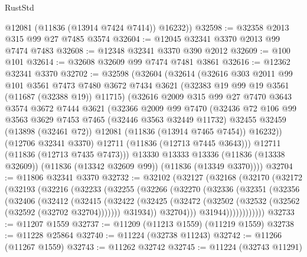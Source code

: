 \begin{lexlean}{RustStd}
\begin{coremodule}
        @12081
        (@11836 (@13914 @7424 @7414))
        @16232))
@32598 := @32358 @2013 @315 @99 @27 @7485 @3574
@32604 := @12045 @32341 @3370 @2013 @99 @7474 @7483
@32608 := @12348 @32341 @3370 @390 @2012
@32609 := @100 @101
@32614 := @32608 @32609 @99 @7474 @7481 @3861
@32616 := @12362 @32341 @3370
@32702 := @32598
    (@32604
      (@32614
        (@32616
          @303
          @2011
          @99
          @101
          @3561
          @7473
          @7480
          @3672
          @7434
          @3621
          (@32383 @19 @99 @19 @3561 (@11687 (@32388 @19)) @11715)
          (@32616
            @2009
            @315
            @99
            @27
            @7470
            @3643
            @3574
            @3672
            @7444
            @3621
            (@32366
              @2009
              @99
              @7470
              (@32436
                @72
                @106
                @99
                @3563
                @3629
                @7453
                @7465
                (@32446 @3563 @32449 @11732)
                @32455
                @32459
                (@13898 (@32461 @72))
                @12081
                (@11836 (@13914 @7465 @7454))
                @16232))
            (@12706 @32341 @3370)
            @12711
            (@11836 (@12713 @7445 @3643)))
          @12711
          (@11836 (@12713 @7435 @7473)))
        @13330
        @13333
        @13336
        (@11836 (@13338 @32609))
        (@11836 (@13342 @32609 @99))
        (@11836 (@13349 @3370))))
@32704 := @11806 @32341 @3370
@32732 := @32102
    (@32127
      (@32168
        (@32170
          (@32172
            (@32193
              (@32216
                (@32233
                  (@32255
                    (@32266
                      (@32270
                        (@32336
                          (@32351
                            (@32356
                              (@32406
                                (@32412
                                  (@32415
                                    (@32422
                                      (@32425
                                        (@32472
                                          (@32502 (@32532 (@32562 (@32592 (@32702 @32704)))))))
                                      @31934))
                                  @32704)))
                            @31944))))))))))))
@32733 := @11207 @1559
@32737 := @11209 (@11213 @1559) (@11219 @1559)
@32738 := @11228 @25864
@32740 := @11224 (@32738 @11243)
@32742 := @11266 (@11267 @1559)
@32743 := @11262 @32742
@32745 := @11224 (@32743 @11291)

\end{coremodule}
\end{lexlean}
